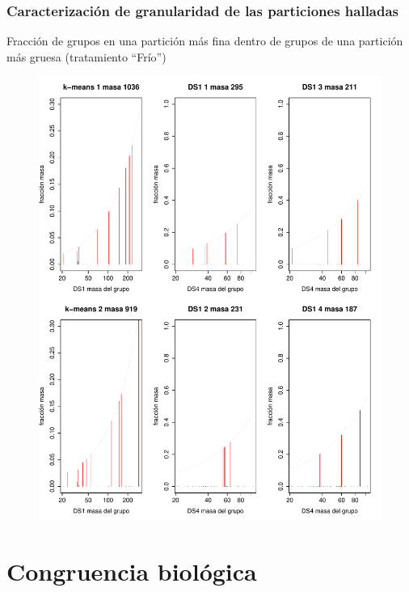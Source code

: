 \documentclass[serif,9pt, t]{beamer}
\begin{document}
\begin{frame}\frametitle{Caracterización de granularidad de las particiones halladas} 
\centering
Fracción de grupos en una partición más fina dentro de grupos de una partición más gruesa (tratamiento ``Frío'')
\begin{figure}
    \centering
	\includegraphics[height=1.6\textheight]{fraccion_de_km_en_ds1_en_ds4.pdf}	
\end{figure}
\end{frame}

\section{Congruencia biológica}
\end{document}

